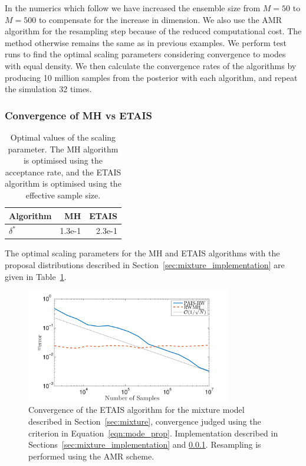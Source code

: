 \documentclass[final]{siamltex}
\begin{document}
In the numerics which follow we have increased the ensemble size from
$M=50$ to $M=500$ to compensate for the increase in dimension. We also
use the AMR algorithm for the resampling step because of the reduced
computational cost. The method otherwise remains the same as in
previous examples. We perform test runs to find the optimal scaling
parameters considering convergence to modes with equal density. We
then calculate the convergence rates of the algorithms by producing 10
million samples from the posterior with each algorithm, and repeat the
simulation 32 times.

\subsubsection{Convergence of MH vs ETAIS}\label{sec:mixture_conv}

\begin{table}[!htb]
      \centering
        \begin{tabular}{|l|r|r|}
	\hline
	Algorithm	& MH & ETAIS \\ \hline
	$\delta^*$	& 1.3e-1     & 2.3e-1 \\
	\hline
	\end{tabular}
	\vspace{1mm}
	\caption{Optimal values of the scaling parameter. The MH algorithm is optimised using the acceptance rate, and the ETAIS algorithm is optimised using the effective sample size.}
	\label{table:mixture_opt_beta}
\end{table}

The optimal scaling parameters for the MH and ETAIS algorithms with the proposal distributions described in Section~\ref{sec:mixture_implementation} are given in Table~\ref{table:mixture_opt_beta}.

\begin{figure}[htb]
\centering
\includegraphics[width=0.8\textwidth]{"figures/Mode_proportions"}
\caption{Convergence of the ETAIS algorithm for the mixture model described in Section~\ref{sec:mixture}, convergence judged using the criterion in Equation~\eqref{eqn:mode_prop}. Implementation described in Sections~\ref{sec:mixture_implementation} and \ref{sec:mixture_conv}. Resampling is performed using the AMR scheme.}
\label{fig:mixture_modes}
\end{figure}
\end{document}
